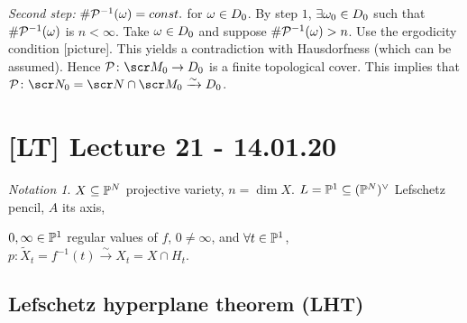 \documentclass[A4paper, british]{amsart}
\theoremstyle{darkgreentheorem}
\theoremstyle{darkbluedefinition}
\theoremstyle{darkredexample}
\theoremstyle{remark}
\newtheorem{nota}[thm]{Notation}
\newcommand{\1}{\mathbbm{1}}
\newcommand{\dual}{^{\vee}}
\newcommand{\sub}{\subseteq}
\begin{document}
\textit{Second step:}
$\# \calP^{-1}(\w)=const.$ for $\w\in D_{0}$.
By step $1$, $\exists \w_{0}\in D_{0}$ such that $\# \calP^{-1}(\w)$ is $n<\infty$.
Take $\w\in D_{0}$ and suppose $\# \calP^{-1}(\w)>n$.
Use the ergodicity condition [picture].
This yields a contradiction with Hausdorfness (which can be assumed).
Hence $\calP\colon \M_{0}\to D_{0}$ is a finite topological cover.
This implies that $\calP\colon \sN_{0}=\sN\cap \M_{0}\xrightarrow{\sim} D_{0}$.

\section{[LT] Lecture 21 - 14.01.20}

\begin{nota}
    $X\sub \P^{N}$ projective variety, $n=\dim{X}$.
    $L=\P^{1}\sub (\P^{N})\dual$ Lefschetz pencil, $A$ its axis,
    \begin{center}
    \end{center}
    $0,\infty\in\P^{1}$ regular values of $f$, $0\neq \infty$, and $\forall t\in \P^{1}$, $p\colon \tilde{X}_{t}=f^{-1}(t)\xrightarrow{\sim} X_{t}=X\cap H_{t}$.
    \begin{center}
    \end{center}
    \begin{center}
    \end{center}
\end{nota}

\subsection{Lefschetz hyperplane theorem (LHT)}
\end{document}

